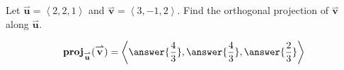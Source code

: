 \documentclass{ximera}
\author{Gregory Hartman \and Matthew Carr}
\begin{document}
\begin{exercise}
Let $\overset{\boldsymbol{\rightharpoonup}}{\mathbf{u}} = \left< 2,2,1 \right>$ and $\overset{\boldsymbol{\rightharpoonup}}{\mathbf{v}} = \left< 3,-1,2 \right>$. Find the
orthogonal projection of $\overset{\boldsymbol{\rightharpoonup}}{\mathbf{v}}$ along $\overset{\boldsymbol{\rightharpoonup}}{\mathbf{u}}$.
\begin{prompt}
\[
\mathbf{proj}_{\overset{\boldsymbol{\rightharpoonup}}{\mathbf{u}}}(\overset{\boldsymbol{\rightharpoonup}}{\mathbf{v}})= \left< \answer{\frac{4}{3}},\answer{\frac{4}{3}},\answer{\frac{2}{3}} \right>
\]
\end{prompt}

\end{exercise}
\end{document}

